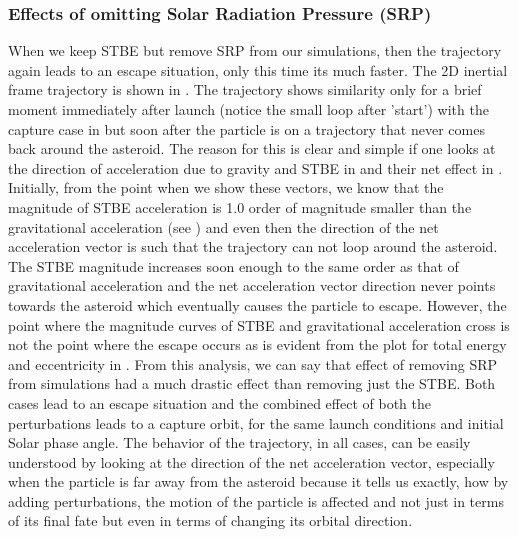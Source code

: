 \subsubsection{Effects of omitting Solar Radiation Pressure (SRP)}
When we keep \gls{STBE} but remove \gls{SRP} from our simulations, then the trajectory again leads to an escape situation, only this time its much faster. The 2D inertial frame trajectory is shown in . The trajectory shows similarity only for a brief moment immediately after launch (notice the small loop after 'start') with the capture case in  but soon after the particle is on a trajectory that never comes back around the asteroid. The reason for this is clear and simple if one looks at the direction of acceleration due to gravity and \gls{STBE} in  and their net effect in . Initially, from the point when we show these vectors, we know that the magnitude of \gls{STBE} acceleration is 1.0 order of magnitude smaller than the gravitational acceleration (see ) and even then the direction of the net acceleration vector is such that the trajectory can not loop around the asteroid. The \gls{STBE} magnitude increases soon enough to the same order as that of gravitational acceleration and the net acceleration vector direction never points towards the asteroid which eventually causes the particle to escape. However, the point where the magnitude curves of \gls{STBE} and gravitational acceleration cross is not the point where the escape occurs as is evident from the plot for total energy and eccentricity in .
%
\newline\newline
%
From this analysis, we can say that effect of removing \gls{SRP} from simulations had a much drastic effect than removing just the \gls{STBE}. Both cases lead to an escape situation and the combined effect of both the perturbations leads to a capture orbit, for the same launch conditions and initial Solar phase angle. The behavior of the trajectory, in all cases, can be easily understood by looking at the direction of the net acceleration vector, especially when the particle is far away from the asteroid because it tells us exactly, how by adding perturbations, the motion of the particle is affected and not just in terms of its final fate but even in terms of changing its orbital direction.
